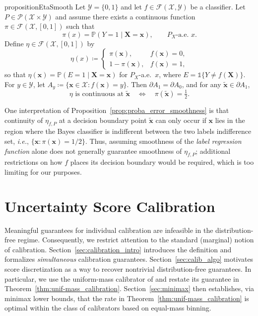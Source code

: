 \documentclass{article}
\theoremstyle{plain}
\theoremstyle{definition}
\theoremstyle{remark}
\begin{document}
\begin{restatable}[]{proposition}{EtaSmooth}
\label{prop:proba_error_smoothness}
Let $\mathcal{Y}= \{0,1\}$ and let $f \in \mathcal{F}(\mathcal{X}, \mathcal{Y})$ be a classifier.
Let $P \in \mathcal{P}(\mathcal{X} \times \mathcal{Y})$ and assume there exists a continuous function
$\pi\in \mathcal{F}(\mathcal{X}, [0,1])$ such that
\[
\pi(x)=\mathbb{P}(Y=1\mid \mathbf{X}=\mathbf{x}),\qquad P_X\text{-a.e. } x.
\]
Define $\eta\in \mathcal{F}(\mathcal X,[0,1])$ by
\[
\eta(x)\coloneqq
\begin{cases}
\pi(\mathbf{x}), & f(\mathbf{x})=0,\\
1-\pi(\mathbf{x}), & f(\mathbf{x})=1,
\end{cases}
\]
so that $\eta(\mathbf{x})=\mathbb{P}(E=1\mid \mathbf{X}=\mathbf{x})$ for $P_X$-a.e.\ $x$, where $E=\mathds 1\{Y\neq f(\mathbf{X})\}$.
For $y\in\mathcal{Y}$, let $A_y\coloneqq\{\mathbf{x} \in\mathcal{X}: f(\mathbf{x})=y\}$.
Then $\partial A_1=\partial A_0$, and for any $\tilde{\mathbf{x}}\in\partial A_1$,
\[
\eta \text{ is continuous at }\tilde{\mathbf{x}}
\quad\Longleftrightarrow\quad
\pi(\tilde{\mathbf{x}})=\tfrac{1}{2}.
\]
\end{restatable}

One interpretation of Proposition~\ref{prop:proba_error_smoothness} is that continuity of $\eta_{f,P}$ at a
decision boundary point $\tilde{\mathbf{x}}$ can only occur if $\mathbf{x}$ lies in the region where the Bayes classifier is indifferent between the two labels indifference set, \textit{i.e.},
$\{\mathbf{x}:\pi(\mathbf{x})=1/2\}$.
Thus, assuming smoothness of the \emph{label regression function} alone does not generally guarantee smoothness of
\(\eta_{f,P}\); additional restrictions on how \(f\) places its decision boundary would be required, which is too limiting
for our purposes.

\section{Uncertainty Score Calibration}
\label{sec:score_calibration}
Meaningful guarantees for individual calibration are infeasible in the distribution-free regime. Consequently, we restrict attention to the standard (marginal) notion of calibration. Section~\ref{sec:calibration_intro} introduces the definition and formalizes \emph{simultaneous} calibration guarantees. Section~\ref{sec:calib_algo} motivates score discretization as a way to recover nontrivial distribution-free guarantees. In particular, we use the uniform-mass calibrator of \cite{gupta_distribution-free_2021} and restate its guarantee in Theorem~\ref{thm:unif-mass_calibration}. Section~\ref{sec:minimax} then establishes, via minimax lower bounds, that the rate in Theorem~\ref{thm:unif-mass_calibration} is optimal within the class of calibrators based on equal-mass binning.
\end{document}
